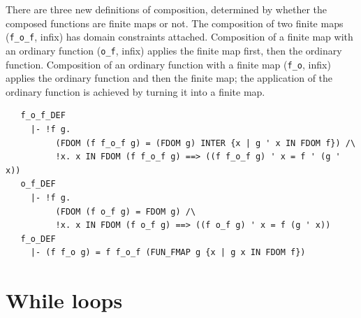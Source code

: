 There are three new definitions of composition, determined by whether
the composed functions are finite maps or not. The composition of two
finite maps (\verb+f_o_f+, infix) has domain constraints
attached. Composition of a finite map with an ordinary function
(\verb+o_f+, infix) applies the finite map first, then the ordinary
function.  Composition of an ordinary function with a finite map
(\verb+f_o+, infix) applies the ordinary function and then the finite
map; the application of the ordinary function is achieved by turning
it into a finite map.
%
\begin{hol}
\begin{verbatim}
   f_o_f_DEF
     |- !f g.
          (FDOM (f f_o_f g) = (FDOM g) INTER {x | g ' x IN FDOM f}) /\
          !x. x IN FDOM (f f_o_f g) ==> ((f f_o_f g) ' x = f ' (g ' x))
   o_f_DEF
     |- !f g.
          (FDOM (f o_f g) = FDOM g) /\
          !x. x IN FDOM (f o_f g) ==> ((f o_f g) ' x = f (g ' x))
   f_o_DEF
     |- (f f_o g) = f f_o_f (FUN_FMAP g {x | g x IN FDOM f})
\end{verbatim}
\end{hol}

\section{While loops}
\label{sec:while-loops}

